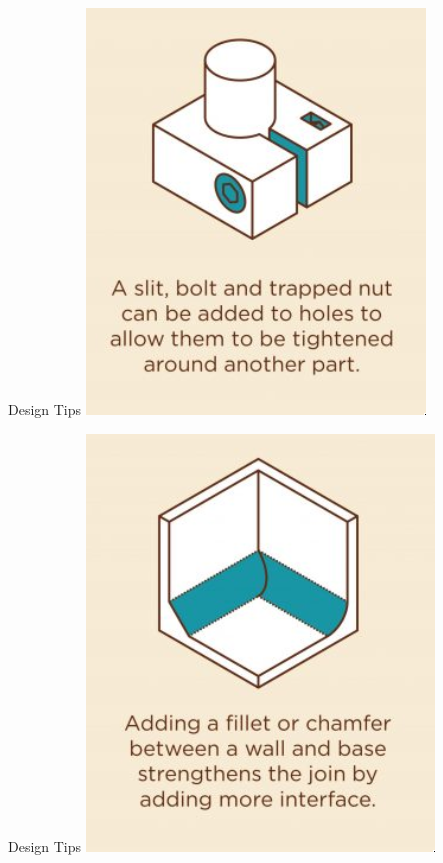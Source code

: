 \documentclass{presentation}
\begin{document}
\begin{frame}{Design Tips}
  \centering
  \includegraphics[width=\textwidth/2]{./trapped-nut.jpg}
\end{frame}

\begin{frame}{Design Tips}
  \centering
  \includegraphics[width=\textwidth/2]{./chamfer.jpg}
\end{frame}
\end{document}
